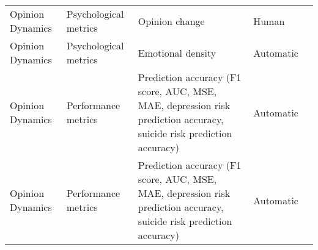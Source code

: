 \begin{small}
\begin{center}
\begin{longtable}{@{}p{}p{}p{}p{}p{}@{}}
Opinion Dynamics         & Psychological metrics & Opinion change                                                                                                                                                                                              & Human     & \cite{triem2024tipping}                                                                                                                                                                                                                                                                                                                                                         \\
Opinion Dynamics         & Psychological metrics & Emotional density                                                                                                                                                                                           & Automatic & \cite{Gao2023S3SS}                                                                                                                                                                                                                                                                                                                                                                                                  \\
Opinion Dynamics         & Performance metrics                 & Prediction accuracy (F1 score, AUC, MSE, MAE, depression risk prediction accuracy, suicide risk prediction accuracy)                                                                                        & Automatic & \cite{Gao2023S3SS}                                                                                                                                                                                                                                                                                                                                                                                                  \\
Opinion Dynamics         & Performance metrics                 & Prediction accuracy (F1 score, AUC, MSE, MAE, depression risk prediction accuracy, suicide risk prediction accuracy)                                                                                        & Automatic & \cite{Mou2024UnveilingTT}                                                                                                                                                                                                                                                                                                                                                                                                   \\

\end{longtable}
\end{center}
\end{small}
